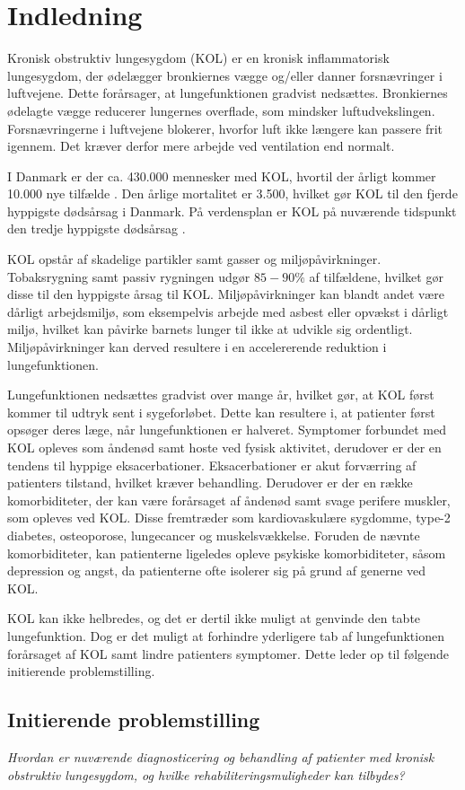 \chapter{Indledning} 
Kronisk obstruktiv lungesygdom (KOL) er en kronisk inflammatorisk lungesygdom, der ødelægger bronkiernes vægge og/eller danner forsnævringer i luftvejene. Dette forårsager, at lungefunktionen gradvist nedsættes.\cite{Basisbogen2016} Bronkiernes ødelagte vægge reducerer lungernes overflade, som mindsker luftudvekslingen. Forsnævringerne i luftvejene blokerer, hvorfor luft ikke længere kan passere frit igennem. Det kræver derfor mere arbejde ved ventilation end normalt.\cite{Lungeforeningen2016}

I Danmark er der ca. 430.000 mennesker med KOL, hvortil der årligt kommer 10.000 nye tilfælde \cite{Sygdomsbyrden2015}. Den årlige mortalitet er 3.500, hvilket gør KOL til den fjerde hyppigste dødsårsag i Danmark.\cite{Basisbogen2016} På verdensplan er KOL på nuværende tidspunkt den tredje hyppigste dødsårsag \cite{WHO2017}.

KOL opstår af skadelige partikler samt gasser og miljøpåvirkninger. Tobaksrygning samt passiv rygningen udgør $85-90\%$ af tilfældene, hvilket gør disse til den hyppigste årsag til KOL.\cite{Basisbogen2016,dsam2016,Martinez2016,Sygdomsbyrden2015}
Miljøpåvirkninger kan blandt andet være dårligt arbejdsmiljø, som eksempelvis arbejde med asbest eller opvækst i dårligt miljø, hvilket kan påvirke barnets lunger til ikke at udvikle sig ordentligt. Miljøpåvirkninger kan derved resultere i en accelererende reduktion i lungefunktionen.\cite{Martinez2016}

Lungefunktionen nedsættes gradvist over mange år, hvilket gør, at KOL først kommer til udtryk sent i sygeforløbet. Dette kan resultere i, at patienter først opsøger deres læge, når lungefunktionen er halveret.\cite{dsam2016} Symptomer forbundet med KOL opleves som åndenød samt hoste ved fysisk aktivitet, derudover er der en tendens til hyppige eksacerbationer. Eksacerbationer er akut forværring af patienters tilstand, hvilket kræver behandling.\cite{Basisbogen2016,dsam2016}
Derudover er der en række komorbiditeter, der kan være forårsaget af åndenød samt svage perifere muskler, som opleves ved KOL. Disse fremtræder som kardiovaskulære sygdomme, type-2 diabetes, osteoporose, lungecancer og muskelsvækkelse. Foruden de nævnte komorbiditeter, kan patienterne ligeledes opleve psykiske komorbiditeter, såsom depression og angst, da patienterne ofte isolerer sig på grund af generne ved KOL.\cite{dsam2016}

KOL kan ikke helbredes, og det er dertil ikke muligt at genvinde den tabte lungefunktion. Dog er det muligt at forhindre yderligere tab af lungefunktionen forårsaget af KOL samt lindre patienters symptomer.\cite{Basisbogen2016} Dette leder op til følgende initierende problemstilling.


\section{Initierende problemstilling}
\textit{Hvordan er nuværende diagnosticering og behandling af patienter med kronisk obstruktiv lungesygdom, og hvilke rehabiliteringsmuligheder kan tilbydes?}